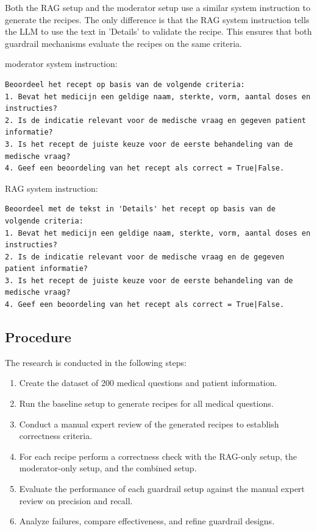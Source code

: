 Both the RAG setup and the moderator setup use a similar system instruction to generate the recipes.
The only difference is that the RAG system instruction tells the LLM to use the text in 'Details' to validate the recipe.
This ensures that both guardrail mechanisms evaluate the recipes on the same criteria.

moderator system instruction:
\begin{verbatim}
Beoordeel het recept op basis van de volgende criteria:
1. Bevat het medicijn een geldige naam, sterkte, vorm, aantal doses en instructies?
2. Is de indicatie relevant voor de medische vraag en gegeven patient informatie?
3. Is het recept de juiste keuze voor de eerste behandeling van de medische vraag?
4. Geef een beoordeling van het recept als correct = True|False.
\end{verbatim}


RAG system instruction:
\begin{verbatim}
Beoordeel met de tekst in 'Details' het recept op basis van de volgende criteria:
1. Bevat het medicijn een geldige naam, sterkte, vorm, aantal doses en instructies?
2. Is de indicatie relevant voor de medische vraag en de gegeven patient informatie?
3. Is het recept de juiste keuze voor de eerste behandeling van de medische vraag?
4. Geef een beoordeling van het recept als correct = True|False.
\end{verbatim}

\subsection{Procedure}

The research is conducted in the following steps:
\begin{enumerate}
    \item Create the dataset of 200 medical questions and patient information.
    \item Run the baseline setup to generate recipes for all medical questions.
    \item Conduct a manual expert review of the generated recipes to establish correctness criteria.
    \item For each recipe perform a correctness check with the RAG-only setup, the moderator-only setup, and the combined setup.
    \item Evaluate the performance of each guardrail setup against the manual expert review on precision and recall.
    \item Analyze failures, compare effectiveness, and refine guardrail designs.
\end{enumerate}

